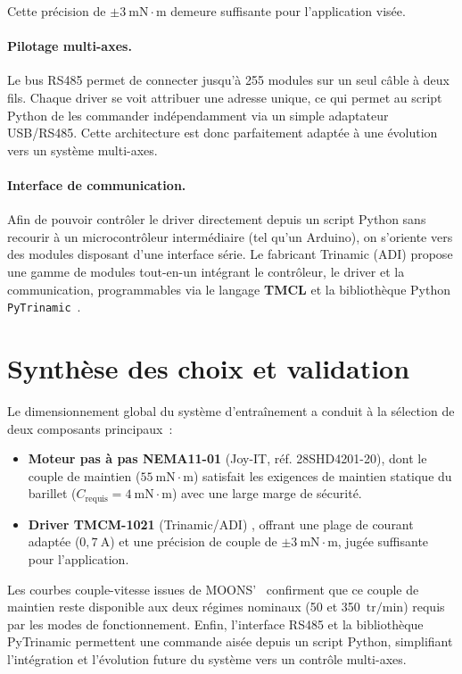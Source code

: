 Cette précision de $\pm 3\ \mathrm{mN{\cdot}m}$ demeure suffisante pour l'application visée.

\paragraph{Pilotage multi-axes.}
Le bus RS485 permet de connecter jusqu'à 255 modules sur un seul câble à deux
fils. Chaque driver se voit attribuer une adresse unique, ce qui permet au script
Python de les commander indépendamment via un simple adaptateur USB/RS485. Cette
architecture est donc parfaitement adaptée à une évolution vers un système
multi-axes.

\paragraph{Interface de communication.}
Afin de pouvoir contrôler le driver directement depuis un script Python sans
recourir à un microcontrôleur intermédiaire (tel qu'un Arduino), on s'oriente
vers des modules disposant d'une interface série. Le fabricant Trinamic (ADI)
propose une gamme de modules tout-en-un intégrant le contrôleur, le driver et
la communication, programmables via le langage \textbf{TMCL} et la bibliothèque
Python \texttt{PyTrinamic}~\cite{trinamic_pytrinamic}.

\section{Synthèse des choix et validation}

Le dimensionnement global du système d'entraînement a conduit à la sélection
de deux composants principaux~:

\begin{itemize}
  \item \textbf{Moteur pas à pas NEMA11-01} (Joy-IT, réf. 28SHD4201-20), dont le couple
    de maintien ($55\ \mathrm{mN{\cdot}m}$) satisfait les exigences de maintien statique
    du barillet ($C_\text{requis} = 4\ \mathrm{mN{\cdot}m}$) avec une large marge de sécurité.
    
  \item \textbf{Driver TMCM-1021} (Trinamic/ADI) \cite{trinamic_tmcm_1021}, offrant une plage de courant adaptée
    ($0{,}7\ \mathrm{A}$) et une précision de couple de $\pm 3\ \mathrm{mN{\cdot}m}$,
    jugée suffisante pour l'application.
\end{itemize}

Les courbes couple-vitesse issues de MOONS'~\cite{moons_nema10, moons_nema11} confirment
que ce couple de maintien reste disponible aux deux régimes nominaux
(50 et 350~$\mathrm{tr/min}$) requis par les modes de fonctionnement.
Enfin, l'interface RS485 et la bibliothèque PyTrinamic permettent une commande
aisée depuis un script Python, simplifiant l'intégration et l'évolution future
du système vers un contrôle multi-axes.

